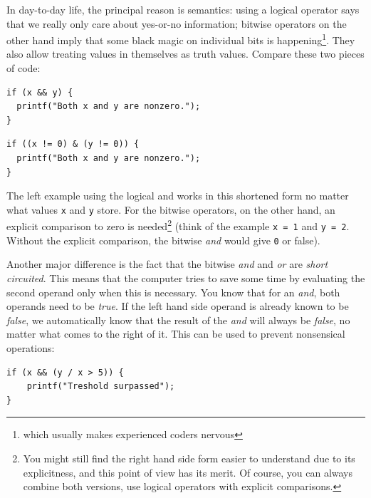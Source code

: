 In day-to-day life, the principal reason is semantics: using a logical operator says that we really only care about yes-or-no information; bitwise operators on the other hand imply that some black magic on individual bits is happening\footnote{which usually makes experienced coders nervous}. They also allow treating values in themselves as truth values. Compare these two pieces of code:
{
\begin{tcbraster}[raster columns=2,
                  raster equal height,
                  nobeforeafter,
                  raster column skip=0.2cm]
\begin{codebox}[nonzeroLogicalAnd.c]
\begin{verbatim}
if (x && y) {
  printf("Both x and y are nonzero.");
}
\end{verbatim}
\end{codebox}
%
\begin{codebox}[nonzeroBitwiseAnd.c]
\begin{verbatim}
if ((x != 0) & (y != 0)) {
  printf("Both x and y are nonzero.");
}
\end{verbatim}
\end{codebox}
\end{tcbraster}
}

The left example using the logical and works in this shortened form no matter what values \texttt{x} and \texttt{y} store. For the bitwise operators, on the other hand, an explicit comparison to zero is needed\footnote{You might still find the right hand side form easier to understand due to its explicitness, and this point of view has its merit. Of course, you can always combine both versions, \ie use logical operators with explicit comparisons.} (think of the example \texttt{x = 1} and \texttt{y = 2}. Without the explicit comparison, the bitwise \emph{and} would give \texttt{0} or false).

Another major difference is the fact that the bitwise \emph{and} and \emph{or} are \emph{short circuited}. This means that the computer tries to save some time by evaluating the second operand only when this is necessary. You know that for an \emph{and}, both operands need to be \emph{true}. If the left hand side operand is already known to be \emph{false}, we automatically know that the result of the \emph{and} will always be \emph{false}, no matter what comes to the right of it. This can be used to prevent nonsensical operations:
\begin{codebox}
\begin{verbatim}
if (x && (y / x > 5)) {
    printf("Treshold surpassed");
}
\end{verbatim}
\end{codebox}

